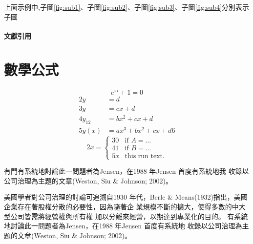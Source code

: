 \documentclass[
    添加扉頁=是,
    添加原創聲明頁=不,
    添加校徽水印=不,
    奇偶頁邊距對稱=不,
    參考文獻頂格=是,
]{.def/must}
\begin{document}
上面示例中,子圖\ref{fig:sub1}、子圖\ref{fig:sub2}、子圖\ref{fig:sub3}、子圖\ref{fig:sub4}分別表示子圖








\subsubsection{文獻引用}
 
\chapter{數學公式}
\begin{equation}
\label{eq1}
e^{\pi i}+1=0
\end{equation}
\begin{align}
2 y & =d\label{eq:IntoSection}\\
3 y & =cx+d\\
4 y_{12} & =bx^{2}+cx+d\\
5 y(x) & =ax^{3}+bx^{2}+cx+d
6 
\end{align}
\begin{equation}
2 x=\left\{ \begin{array}{cl}
3 0 & \textrm{if }A=\ldots\\
4 1 & \textrm{if }B=\ldots\\
5 x & \textrm{this run  text.}\end
{array}\right.
\end{equation}       

 
有門有系統地討論此一問題者為Jensen，在1988 年Jensen 首度有系統地我
收錄以公司治理為主題的文章(Weston, Siu \& Johnson; 2002)。

美國學者對公司治理的討論可追溯自1930 年代，Berle \&
Means(1932)指出，美國企業存在著股權分散的必要性，因為隨著企
業規模不斷的擴大，使得多數的中大型公司皆需將經營權與所有權
加以分離來經營，以期達到專業化的目的。
有系統地討論此一問題者為Jensen，在1988 年Jensen 首度有系統地
收錄以公司治理為主題的文章(Weston, Siu \& Johnson; 2002)。
\end{document}
